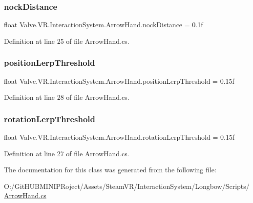 \subsubsection{\texorpdfstring{nockDistance}{nockDistance}}
{\footnotesize\ttfamily float Valve.\+V\+R.\+Interaction\+System.\+Arrow\+Hand.\+nock\+Distance = 0.\+1f}



Definition at line 25 of file Arrow\+Hand.\+cs.

\mbox{\label{class_valve_1_1_v_r_1_1_interaction_system_1_1_arrow_hand_ade30be6b85b696d644ab2250a7ea12c6}} 
\subsubsection{\texorpdfstring{positionLerpThreshold}{positionLerpThreshold}}
{\footnotesize\ttfamily float Valve.\+V\+R.\+Interaction\+System.\+Arrow\+Hand.\+position\+Lerp\+Threshold = 0.\+15f}



Definition at line 28 of file Arrow\+Hand.\+cs.

\mbox{\label{class_valve_1_1_v_r_1_1_interaction_system_1_1_arrow_hand_a196de8b1ec4f79ba4f429b04e68409f9}} 
\subsubsection{\texorpdfstring{rotationLerpThreshold}{rotationLerpThreshold}}
{\footnotesize\ttfamily float Valve.\+V\+R.\+Interaction\+System.\+Arrow\+Hand.\+rotation\+Lerp\+Threshold = 0.\+15f}



Definition at line 27 of file Arrow\+Hand.\+cs.



The documentation for this class was generated from the following file\+:\begin{DoxyCompactItemize}
\item 
O\+:/\+Git\+H\+U\+B\+M\+I\+N\+I\+P\+Roject/\+Assets/\+Steam\+V\+R/\+Interaction\+System/\+Longbow/\+Scripts/\mbox{\hyperlink{_arrow_hand_8cs}{Arrow\+Hand.\+cs}}\end{DoxyCompactItemize}
